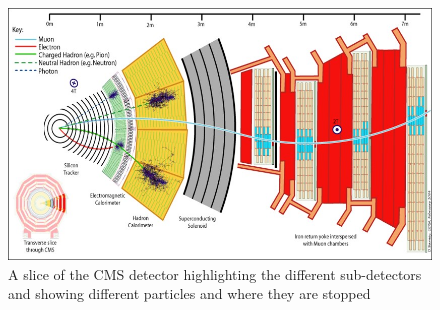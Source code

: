 \begin{figure}
\centering
\includegraphics[width=\linewidth]{Figures/CMSlayout.jpg}
\caption{A slice of the CMS detector highlighting the different sub-detectors and showing different particles and where they are stopped}
\label{fig:CMSlayout}
\end{figure}

